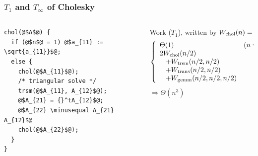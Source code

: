 \documentclass[12pt,dvipdfmx]{beamer}
\newcommand{\minusequal}{\mbox{\tt\ -= }}
\begin{document}
\begin{frame}[fragile]
\frametitle{$T_1$ and $T_\infty$ of Cholesky}
\begin{columns}
\begin{column}{0.40\textwidth}
\begin{lstlisting}[basicstyle=\scriptsize]
chol(@$A$@) {
  if (@$n$@ = 1) @$a_{11} := \sqrt{a_{11}}$@;
  else {
    chol(@$A_{11}$@);
    /* triangular solve */
    trsm(@$A_{11}, A_{12}$@);
    @$A_{21} = {}^tA_{12}$@;
    @$A_{22} \minusequal A_{21} A_{12}$@
    chol(@$A_{22}$@);
  }
}
\end{lstlisting}
\end{column}

\begin{column}{0.6\textwidth}
Work ($T_1$), written by $W_{\mbox{\scriptsize chol}}(n) = $
{\small
\[ 
\left\{
\begin{array}{ll}
\Theta(1) & (n = 1), \\
2 W_{\mbox{\scriptsize chol}}(n/2) & \\
\hspace{0.3cm} + W_{\mbox{\scriptsize trsm}}(n/2, n/2) & \\
\hspace{0.3cm} + W_{\mbox{\scriptsize trans}}(n/2, n/2) & \\
\hspace{0.3cm} + W_{\mbox{\scriptsize gemm}}(n/2, n/2, n/2) & \\
\end{array}
\right.
\]}
$\Rightarrow \Theta(n^3)$
\end{column}
\end{columns}
\end{frame}
\end{document}
